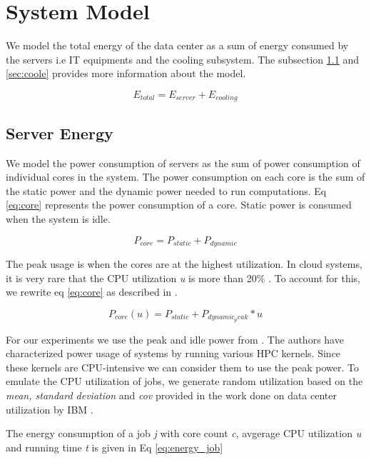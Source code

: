 \documentclass[conference,12pt]{IEEEtran}
\begin{document}
\section{System Model}
\label{sec:sysmodel}
We model the total energy of the data center as a sum of energy consumed by the servers i.e IT equipments and the cooling subsystem. The subsection \ref{sec:servere} and \ref{sec:coole} provides more information about the model.

\begin{equation} \label{eq:etotal}
E_{total} = E_{server} + E_{cooling} 
\end{equation}

\subsection{Server Energy}
\label{sec:servere}
We model the power consumption of servers as the sum of power consumption of individual cores in the system. The power consumption on each core is the sum of the static power and the dynamic power needed to run computations. Eq \ref{eq:core} represents the power consumption of a core. Static power is consumed when the system is idle.

\begin{equation} \label{eq:core}
P_{core} = P_{static} + P_{dynamic} 
\end{equation}

The peak usage is when the cores are at the highest utilization. In cloud systems, it is very rare that the CPU utilization \textit{u} is more than 20\% \cite{birke2012data}. To account for this, we rewrite eq \ref{eq:core} as described in \cite{buyya2010energy}. 

\begin{equation} \label{eq:core_util}
P_{core}(u) = P_{static} + P_{dynamic_peak} * u 
\end{equation}

For our experiments we use the peak and idle power from \cite{kamil2008power}. The authors have characterized power usage of systems by running various HPC kernels. Since these kernels are CPU-intensive we can consider them to use the peak power. To emulate the CPU utilization of jobs, we generate random utilization based on the \textit{mean, standard deviation} and \textit{cov} provided in the work done on data center utilization by IBM \cite{birke2012data}.

The energy consumption of a job \textit{j} with core count \textit{c}, avgerage CPU utilization \textit{u} and running time \textit{t} is given in Eq \ref{eq:energy_job}
\end{document}

